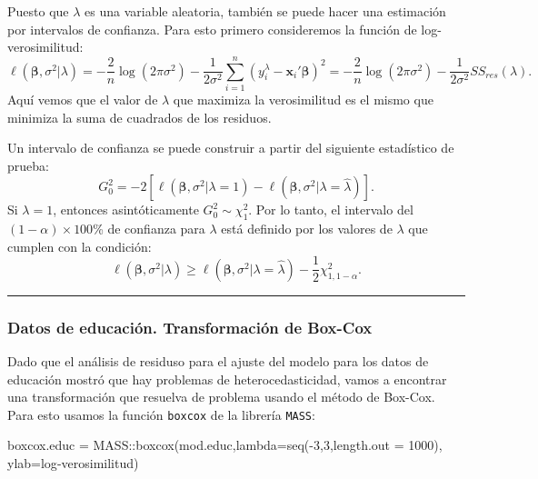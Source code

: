 \documentclass[
]{article}
\newenvironment{Shaded}{\begin{snugshade}}{\end{snugshade}}
\newcommand{\AttributeTok}[1]{\textcolor[rgb]{0.77,0.63,0.00}{#1}}
\newcommand{\DecValTok}[1]{\textcolor[rgb]{0.00,0.00,0.81}{#1}}
\newcommand{\FunctionTok}[1]{\textcolor[rgb]{0.00,0.00,0.00}{#1}}
\newcommand{\NormalTok}[1]{#1}
\newcommand{\OtherTok}[1]{\textcolor[rgb]{0.56,0.35,0.01}{#1}}
\newcommand{\SpecialCharTok}[1]{\textcolor[rgb]{0.00,0.00,0.00}{#1}}
\newcommand{\StringTok}[1]{\textcolor[rgb]{0.31,0.60,0.02}{#1}}
\begin{document}
Puesto que \(\lambda\) es una variable aleatoria, también se puede hacer una estimación por intervalos de confianza. Para esto primero consideremos la función de log-verosimilitud:
\[
\ell(\boldsymbol \beta,\sigma^{2} | \lambda) = -\frac{2}{n}\log \left( 2\pi\sigma^{2}\right) - \frac{1}{2\sigma^{2}}\sum_{i=1}^{n}\left( y_{i}^{\lambda} - \boldsymbol x_{i}'\boldsymbol \beta\right)^{2} = -\frac{2}{n}\log \left( 2\pi\sigma^{2}\right) - \frac{1}{2\sigma^{2}}SS_{res}(\lambda).
\]
Aquí vemos que el valor de \(\lambda\) que maximiza la verosimilitud es el mismo que minimiza la suma de cuadrados de los residuos.

Un intervalo de confianza se puede construir a partir del siguiente estadístico de prueba:
\[
G_{0}^{2} = -2\left[ \ell(\boldsymbol \beta,\sigma^{2} | \lambda=1) - \ell(\boldsymbol \beta,\sigma^{2} | \lambda=\widehat{\lambda}) \right].
\]
Si \(\lambda=1\), entonces asintóticamente \(G_{0}^{2} \sim \chi^{2}_{1}\). Por lo tanto, el intervalo del \((1-\alpha)\times 100\)\% de confianza para \(\lambda\) está definido por los valores de \(\lambda\) que cumplen con la condición:
\[
 \ell(\boldsymbol \beta,\sigma^{2} | \lambda) \geq  \ell(\boldsymbol \beta,\sigma^{2} | \lambda=\widehat{\lambda}) - \frac{1}{2}\chi^{2}_{1,1-\alpha}.
\]

\rule{\textwidth}{0.4pt}

\hypertarget{datos-de-educaciuxf3n.-transformaciuxf3n-de-box-cox}{%
\subsubsection{Datos de educación. Transformación de Box-Cox}\label{datos-de-educaciuxf3n.-transformaciuxf3n-de-box-cox}}

Dado que el análisis de residuso para el ajuste del modelo para los datos de educación mostró que hay problemas de heterocedasticidad, vamos a encontrar una transformación que resuelva de problema usando el método de Box-Cox. Para esto usamos la función \texttt{boxcox} de la librería \texttt{MASS}:

\begin{Shaded}
\begin{Highlighting}[]
\NormalTok{boxcox.educ }\OtherTok{=}\NormalTok{ MASS}\SpecialCharTok{::}\FunctionTok{boxcox}\NormalTok{(mod.educ,}\AttributeTok{lambda=}\FunctionTok{seq}\NormalTok{(}\SpecialCharTok{{-}}\DecValTok{3}\NormalTok{,}\DecValTok{3}\NormalTok{,}\AttributeTok{length.out =} \DecValTok{1000}\NormalTok{),}
                               \AttributeTok{ylab=}\StringTok{\textquotesingle{}log{-}verosimilitud\textquotesingle{}}\NormalTok{)}
\end{Highlighting}
\end{Shaded}
\end{document}

